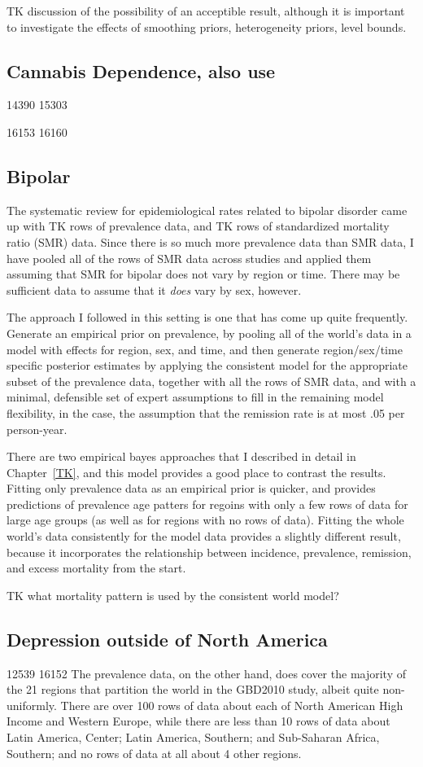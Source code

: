 TK discussion of the possibility of an acceptible result, although it
is important to investigate the effects of smoothing priors,
heterogeneity priors, level bounds.

\subsection{Cannabis Dependence, also use}
14390 15303 

16153 16160 

\subsection{Bipolar}
The systematic review for epidemiological rates related to bipolar
disorder came up with TK rows of prevalence data, and TK rows of
standardized mortality ratio (SMR) data.  Since there is so much more
prevalence data than SMR data, I have pooled all of the rows of SMR
data across studies and applied them assuming that SMR for bipolar
does not vary by region or time.  There may be sufficient data to assume
that it \emph{does} vary by sex, however. 

The approach I followed in this setting is one that has come up quite
frequently.  Generate an empirical prior on prevalence, by pooling all
of the world's data in a model with effects for region, sex, and
time, and then generate region/sex/time specific posterior estimates
by applying the consistent model for the appropriate subset of the
prevalence data, together with all the rows of SMR data, and with a
minimal, defensible set of expert assumptions to fill in the remaining
model flexibility, in the case, the assumption that the remission rate
is at most .05 per person-year.

There are two empirical bayes approaches that I described in detail in
Chapter~\ref{TK}, and this model provides a good place to contrast the
results.  Fitting only prevalence data as an empirical prior is
quicker, and provides predictions of prevalence age patters for
regoins with only a few rows of data for large age groups (as well as
for regions with no rows of data).  Fitting the whole world's data
consistently for the model data provides a slightly different result,
because it incorporates the relationship between incidence,
prevalence, remission, and excess mortality from the start.

TK what mortality pattern is used by the consistent world model?

\subsection{Depression outside of North America}
12539 
16152
 The prevalence data, on the
other hand, does cover the majority of the 21 regions that partition
the world in the GBD2010 study, albeit quite non-uniformly.  There are
over 100 rows of data about each of North American High Income and
Western Europe, while there are less than 10 rows of data about Latin
America, Center; Latin America, Southern; and Sub-Saharan Africa,
Southern; and no rows of data at all about 4 other regions.

